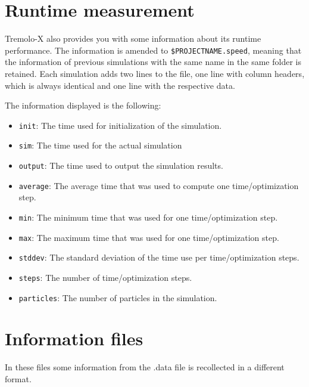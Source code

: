 
\section{Runtime measurement}
Tremolo-X also provides you with some information about its runtime performance. The information is amended to {\tt \$PROJECTNAME.speed}, meaning that the information of previous simulations with the same name in the same folder is retained. Each simulation adds two lines to the file, one line with column headers, which is always identical and one line with the respective data.

The information displayed is the following:
\begin{itemize}
\item \texttt{init}: The time used for initialization of the simulation.
\item \texttt{sim}: The time used for the actual simulation
\item \texttt{output}: The time used to output the simulation results. 
\item \texttt{average}: The average time that was used to compute one time/optimization step.
\item \texttt{min}: The minimum time that was used for one time/optimization step.
\item \texttt{max}: The maximum time that was used for one time/optimization step.
\item \texttt{stddev}: The standard deviation of the time use per time/optimization steps.
\item \texttt{steps}: The number of time/optimization steps.
\item \texttt{particles}: The number of particles in the simulation.

\end{itemize}

\section{Information files}
In these files some information from the .data file is recollected in a different format.

